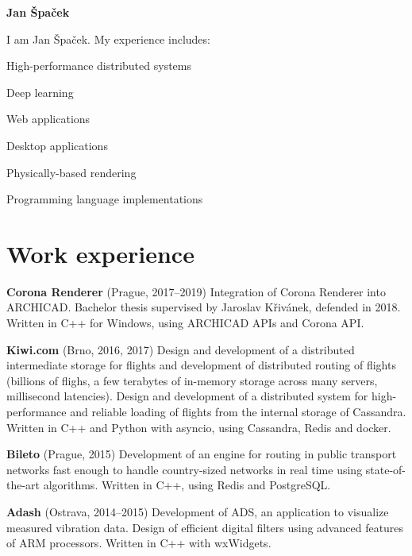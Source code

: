 \documentclass[11pt,a4paper]{article}
\begin{document}
\thispagestyle{empty}
\sffamily

{\bfseries\huge Jan Špaček}

\begin{multicols}{2}

I am Jan Špaček. My experience includes:
\begin{compactitem}
  \item High-performance distributed systems
  \item Deep learning
  \item Web applications
  \item Desktop applications
  \item Physically-based rendering
  \item Programming language implementations
\end{compactitem}

\section*{Work experience}

\textbf{Corona Renderer} (Prague, 2017–2019)
  \newline Integration of Corona Renderer into ARCHICAD.
  \newline Bachelor thesis supervised by Jaroslav Křivánek, defended in 2018.
  \newline Written in C++ for Windows, using ARCHICAD APIs and Corona API.

\textbf{Kiwi.com} (Brno, 2016, 2017)
  \newline Design and development of a distributed intermediate storage for
  flights and development of distributed routing of flights (billions of
  flighs, a few terabytes of in-memory storage across many servers,
  millisecond latencies).
  \newline Design and development of a distributed system for high-performance
  and reliable loading of flights from the internal storage of Cassandra.
  \newline Written in C++ and Python with asyncio, using Cassandra, Redis and docker.

\textbf{Bileto} (Prague, 2015)
  \newline Development of an engine for routing in public transport networks
  fast enough to handle country-sized networks in real time using
  state-of-the-art algorithms.
  \newline Written in C++, using Redis and PostgreSQL.

\textbf{Adash} (Ostrava, 2014–2015)
  \newline Development of ADS, an application to visualize measured vibration data.
  \newline Design of efficient digital filters using advanced features of ARM
  processors.
  \newline Written in C++ with wxWidgets.



\end{multicols}
\end{document}
